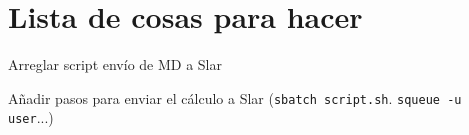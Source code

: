 \section*{Lista de cosas para hacer}

\begin{todolist}

    \item Arreglar script envío de MD a Slar
    \item Añadir pasos para enviar el cálculo a Slar (\texttt{sbatch script.sh}. \texttt{squeue -u user}...)

\end{todolist}